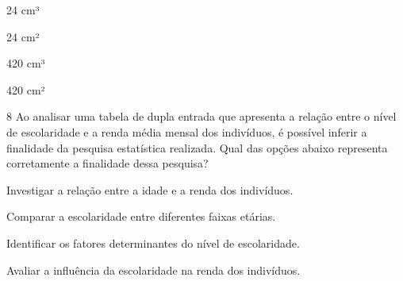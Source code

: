 \begin{escolha}
\item 24 cm³ 
\item 24 cm² 
\item 420 cm³ 
\item 420 cm²
\end{escolha}




\num{8} Ao analisar uma tabela de dupla entrada que apresenta a relação entre
o nível de escolaridade e a renda média mensal dos indivíduos, é
possível inferir a finalidade da pesquisa estatística realizada. Qual
das opções abaixo representa corretamente a finalidade dessa pesquisa?

\begin{escolha}
\item Investigar a relação entre a idade e a renda dos indivíduos.
\item Comparar a escolaridade entre diferentes faixas etárias.
\item Identificar os fatores determinantes do nível de escolaridade.
\item Avaliar a influência da escolaridade na renda dos indivíduos.
\end{escolha}



